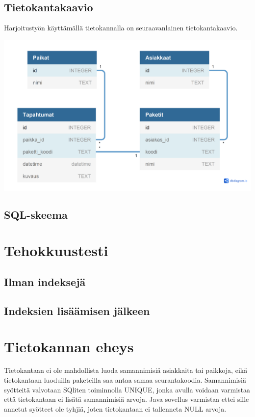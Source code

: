 \documentclass[12pt,a4paper]{article}
\begin{document}
\subsection*{Tietokantakaavio}
Harjoitustyön käyttämällä tietokannalla on seuraavanlainen tietokantakaavio.
\begin{center}

\includegraphics[width=1\textwidth]{TikapeKaavio.png} 
\end{center}
\subsection*{SQL-skeema}

\newpage
\section{Tehokkuustesti}
\subsection*{Ilman indeksejä}
\subsection*{Indeksien lisäämisen jälkeen}

\newpage
\section{Tietokannan eheys}
Tietokantaan ei ole mahdollista luoda samannimisiä asiakkaita tai paikkoja, eikä tietokantaan luoduilla paketeilla saa antaa samaa seurantakoodia. Samannimisiä syötteitä valvotaan SQliten toiminnolla UNIQUE, jonka avulla voidaan varmistaa että tietokantaan ei lisätä samannimisiä arvoja. Java sovellus varmistaa ettei sille annetut syötteet ole tyhjiä, joten tietokantaan ei tallenneta NULL arvoja.
\end{document}
